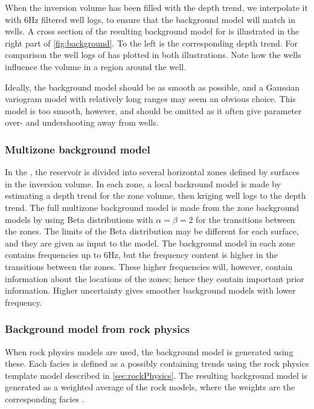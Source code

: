 When the inversion volume has been filled with the depth trend, we
interpolate it with 6Hz filtered well logs, to ensure that the
background model will match in wells. A cross section of the resulting
background model for \vp is illustrated in the right part of
\autoref{fig:background}. To the left is the corresponding depth
trend. For comparison the well logs of \vp has plotted in both
illustrations. Note how the wells influence the volume in a region
around the well.

Ideally, the background model should be as smooth as possible,
and a Gaussian variogram model with relatively long ranges may seem an
obvious choice. This model is too smooth, however, and should be
omitted as it often give parameter over- and undershooting away
from wells.

\subsubsection{Multizone background model}
In the , the reservoir is divided into several horizontal zones defined by surfaces in the inversion volume. In each zone, a local backround model is made by estimating a depth trend for the zone volume, then kriging well logs to the depth trend. The full multizone background model is made from the zone background models by using Beta distributions with $\alpha = \beta =2$ for the transitions between the zones. The limits of the Beta distribution may be different for each surface, and they are given as input to the model. The background model in each zone contains frequencies up to 6Hz, but the frequency content is higher in the transitions between the zones. These higher frequencies will, however, contain information about the locations of the zones; hence they contain important prior information. Higher uncertainty gives smoother background models with lower frequency.

\subsubsection{Background model from rock physics}
When rock physics models are used, the background model is generated using these. Each facies is defined as a  possibly containing trends using the rock physics template model described in \autoref{sec:rockPhysics}. The resulting background model is generated as a weighted average of the rock models, where the weights are the corresponding facies . 

